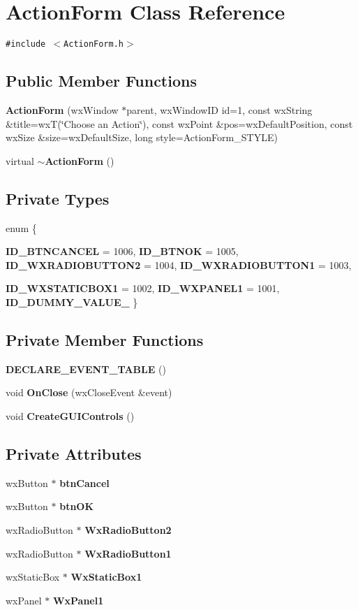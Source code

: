 \section{Action\-Form Class Reference}
\label{class_action_form}
{\tt \#include $<$Action\-Form.h$>$}

\subsection*{Public Member Functions}
\begin{CompactItemize}
\item 
{\bf Action\-Form} (wx\-Window $\ast$parent, wx\-Window\-ID id=1, const wx\-String \&title=wx\-T(\char`\"{}Choose an Action\char`\"{}), const wx\-Point \&pos=wx\-Default\-Position, const wx\-Size \&size=wx\-Default\-Size, long style=Action\-Form\_\-STYLE)
\item 
virtual {\bf $\sim$Action\-Form} ()
\end{CompactItemize}
\subsection*{Private Types}
\begin{CompactItemize}
\item 
enum \{ \par
{\bf ID\_\-BTNCANCEL} =  1006, 
{\bf ID\_\-BTNOK} =  1005, 
{\bf ID\_\-WXRADIOBUTTON2} =  1004, 
{\bf ID\_\-WXRADIOBUTTON1} =  1003, 
\par
{\bf ID\_\-WXSTATICBOX1} =  1002, 
{\bf ID\_\-WXPANEL1} =  1001, 
{\bf ID\_\-DUMMY\_\-VALUE\_\-}
 \}
\end{CompactItemize}
\subsection*{Private Member Functions}
\begin{CompactItemize}
\item 
{\bf DECLARE\_\-EVENT\_\-TABLE} ()
\item 
void {\bf On\-Close} (wx\-Close\-Event \&event)
\item 
void {\bf Create\-GUIControls} ()
\end{CompactItemize}
\subsection*{Private Attributes}
\begin{CompactItemize}
\item 
wx\-Button $\ast$ {\bf btn\-Cancel}
\item 
wx\-Button $\ast$ {\bf btn\-OK}
\item 
wx\-Radio\-Button $\ast$ {\bf Wx\-Radio\-Button2}
\item 
wx\-Radio\-Button $\ast$ {\bf Wx\-Radio\-Button1}
\item 
wx\-Static\-Box $\ast$ {\bf Wx\-Static\-Box1}
\item 
wx\-Panel $\ast$ {\bf Wx\-Panel1}
\end{CompactItemize}


